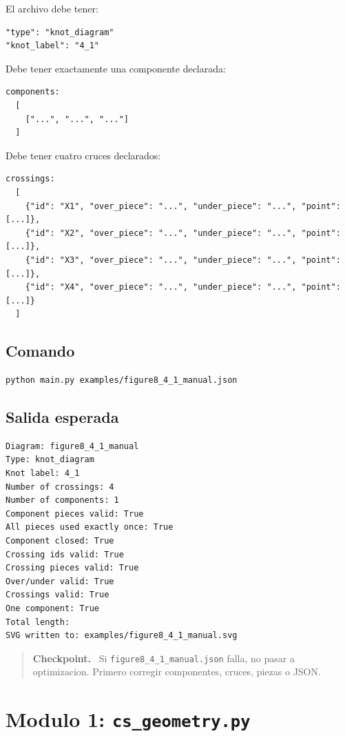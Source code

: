 \documentclass[11pt,letterpaper]{amsart}
\newenvironment{checkpoint}
{\par\medskip\noindent\begin{quote}\textbf{Checkpoint.}\ }
{\end{quote}\par\medskip}
\begin{document}
El archivo debe tener:

\begin{verbatim}
"type": "knot_diagram"
"knot_label": "4_1"
\end{verbatim}

Debe tener exactamente una componente declarada:

\begin{verbatim}
components:
  [
    ["...", "...", "..."]
  ]
\end{verbatim}

Debe tener cuatro cruces declarados:

\begin{verbatim}
crossings:
  [
    {"id": "X1", "over_piece": "...", "under_piece": "...", "point": [...]},
    {"id": "X2", "over_piece": "...", "under_piece": "...", "point": [...]},
    {"id": "X3", "over_piece": "...", "under_piece": "...", "point": [...]},
    {"id": "X4", "over_piece": "...", "under_piece": "...", "point": [...]}
  ]
\end{verbatim}

\subsection{Comando}

\begin{verbatim}
python main.py examples/figure8_4_1_manual.json
\end{verbatim}

\subsection{Salida esperada}

\begin{verbatim}
Diagram: figure8_4_1_manual
Type: knot_diagram
Knot label: 4_1
Number of crossings: 4
Number of components: 1
Component pieces valid: True
All pieces used exactly once: True
Component closed: True
Crossing ids valid: True
Crossing pieces valid: True
Over/under valid: True
Crossings valid: True
One component: True
Total length:
SVG written to: examples/figure8_4_1_manual.svg
\end{verbatim}

\begin{checkpoint}
Si \texttt{figure8\_4\_1\_manual.json} falla, no pasar a optimizacion. Primero
corregir componentes, cruces, piezas o JSON.
\end{checkpoint}

\section{Modulo 1: \texttt{cs\_geometry.py}}
\end{document}
